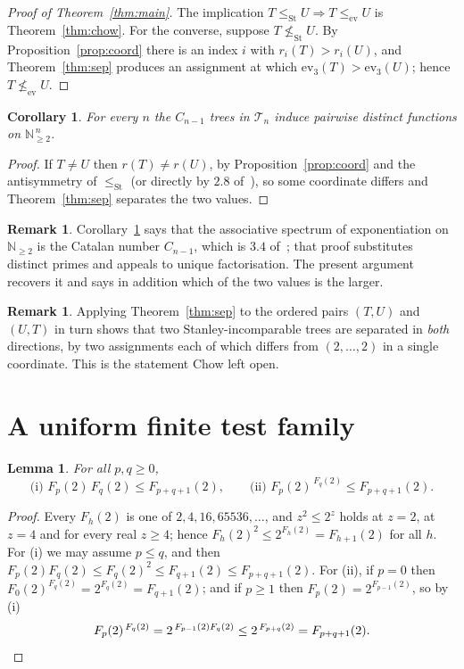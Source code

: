 \documentclass[11pt,a4paper]{article}
\theoremstyle{plain}
\newtheorem{lemma}[theorem]{Lemma}
\newtheorem{corollary}[theorem]{Corollary}
\theoremstyle{definition}
\newtheorem{remark}[theorem]{Remark}
\newcommand{\N}{\mathbb{N}}
\newcommand{\ev}{\mathrm{ev}}
\newcommand{\Tam}{\mathcal{T}}
\newcommand{\St}{\mathrm{St}}
\begin{document}
\begin{proof}[Proof of Theorem~\ref{thm:main}]
The implication $T\le_{\St}U\Rightarrow T\le_{\ev}U$ is
Theorem~\ref{thm:chow}. For the converse, suppose $T\not\le_{\St}U$. By
Proposition~\ref{prop:coord} there is an index $i$ with $r_i(T)>r_i(U)$, and
Theorem~\ref{thm:sep} produces an assignment at which $\ev_3(T)>\ev_3(U)$; hence
$T\not\le_{\ev}U$.
\end{proof}

\begin{corollary}\label{cor:distinct}
For every $n$ the $C_{n-1}$ trees in $\Tam_n$ induce pairwise distinct functions on
$\N_{\ge2}^{\,n}$.
\end{corollary}

\begin{proof}
If $T\ne U$ then $r(T)\ne r(U)$, by Proposition~\ref{prop:coord} and the antisymmetry
of $\le_{\St}$ (or directly by $2.8$ of~\cite{CsW}), so some coordinate differs and
Theorem~\ref{thm:sep} separates the two values.
\end{proof}

\begin{remark}\label{rem:spectrum}
Corollary~\ref{cor:distinct} says that the associative spectrum of exponentiation on
$\N_{\ge2}$ is the Catalan number $C_{n-1}$, which is $3.4$ of~\cite{CsW}; that proof
substitutes distinct primes and appeals to unique factorisation. The present argument
recovers it and says in addition which of the two values is the larger.
\end{remark}

\begin{remark}\label{rem:bothways}
Applying Theorem~\ref{thm:sep} to the ordered pairs $(T,U)$ and $(U,T)$ in turn shows
that two Stanley-incomparable trees are separated in \emph{both} directions, by two
assignments each of which differs from $(2,\dots,2)$ in a single coordinate. This is the
statement Chow left open.
\end{remark}
\section{A uniform finite test family}\label{sec:test}

\begin{lemma}\label{lem:prod}
For all $p,q\ge0$,
\[
  \text{(i) } F_p(2)\,F_q(2)\le F_{p+q+1}(2),
  \qquad
  \text{(ii) } F_p(2)^{\,F_q(2)}\le F_{p+q+1}(2).
\]
\end{lemma}

\begin{proof}
Every $F_h(2)$ is one of $2,4,16,65536,\dots$, and $z^{2}\le2^{z}$ holds at $z=2$, at
$z=4$ and for every real $z\ge4$; hence $F_h(2)^{2}\le2^{F_h(2)}=F_{h+1}(2)$ for all
$h$. For (i) we may assume $p\le q$, and then
$F_p(2)F_q(2)\le F_q(2)^{2}\le F_{q+1}(2)\le F_{p+q+1}(2)$. For (ii), if $p=0$ then
$F_0(2)^{F_q(2)}=2^{F_q(2)}=F_{q+1}(2)$; and if $p\ge1$ then $F_p(2)=2^{F_{p-1}(2)}$, so
by (i)
\[
  F_p(2)^{\,F_q(2)}=2^{\,F_{p-1}(2)F_q(2)}\le2^{\,F_{p+q}(2)}=F_{p+q+1}(2). \qedhere
\]
\end{proof}
\end{document}
